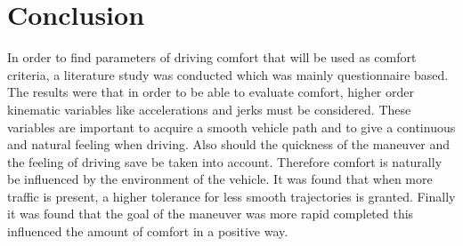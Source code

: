 %
%
%
%


\section{Conclusion}
In order to find parameters of driving comfort that will be used as comfort criteria, a literature study was conducted which was mainly questionnaire based. The results were that in order to be able to evaluate comfort, higher order kinematic variables like accelerations and jerks must be considered. These variables are important to acquire a smooth vehicle path and to give a continuous and natural feeling when driving. Also should the quickness of the maneuver and the feeling of driving save be taken into account.  Therefore comfort is naturally be influenced by the environment of the vehicle. It was found that when more traffic is present, a higher tolerance for less smooth trajectories is granted. Finally it was found that the goal of the maneuver was more rapid completed this influenced the amount of comfort in a positive way.\\

